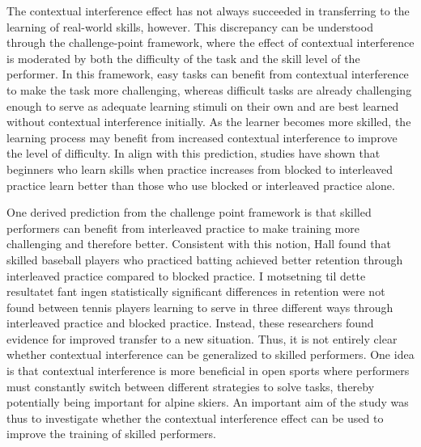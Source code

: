 The contextual interference effect has not always succeeded in transferring to the learning of real-world skills, however. This discrepancy can be understood through the challenge-point framework, where the effect of contextual interference is moderated by both the difficulty of the task and the skill level of the performer. In this framework, easy tasks can benefit from contextual interference to make the task more challenging, whereas difficult tasks are already challenging enough to serve as adequate learning stimuli on their own and are best learned without contextual interference initially. As the learner becomes more skilled, the learning process may benefit from increased contextual interference to improve the level of difficulty. In align with this prediction, studies have shown that beginners who learn skills when practice increases from blocked to interleaved practice learn better than those who use blocked or interleaved practice alone. 

One derived prediction from the challenge point framework is that skilled performers can benefit from interleaved practice to make training more challenging and therefore better. Consistent with this notion, Hall found that skilled baseball players who practiced batting achieved better retention through interleaved practice compared to blocked practice. I motsetning til dette resultatet fant ingen statistically significant differences in retention were not found between tennis players learning to serve in three different ways through interleaved practice and blocked practice. Instead, these researchers found evidence for improved transfer to a new situation. Thus, it is not entirely clear whether contextual interference can be generalized to skilled performers. One idea is that contextual interference is more beneficial in open sports where performers must constantly switch between different strategies to solve tasks, thereby potentially being important for alpine skiers. An important aim of the study was thus to investigate whether the contextual interference effect can be used to improve the training of skilled performers. 









